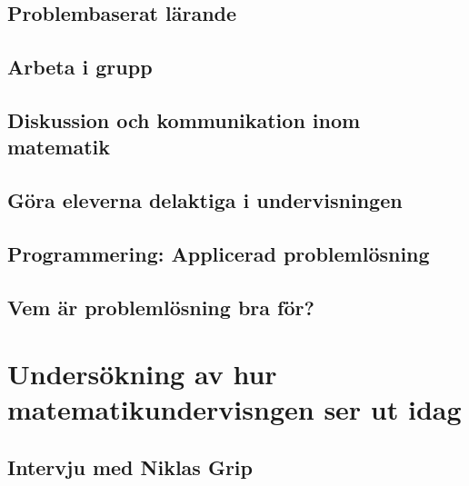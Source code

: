 \documentclass[11pt,a4paper]{article}
\begin{document}
    \subsection{Problembaserat lärande}
        
        
    \subsection{Arbeta i grupp}
        
        
    \subsection{Diskussion och kommunikation inom matematik}
        
        \label{sec:Diskussion}
        
    \subsection{Göra eleverna delaktiga i undervisningen}
        
        \label{sec:delaktighet}
        
    \subsection{Programmering: Applicerad problemlösning}
        \label{sec:ProgrammeringOchMatematik}
        
        
    \subsection{Vem är problemlösning bra för?}
        
    
\section{Undersökning av hur matematikundervisngen ser ut idag}
    
    
    \subsection{Intervju med Niklas Grip}
    
    
\end{document}
